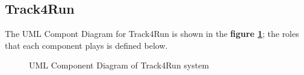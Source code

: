 \subsection{Track4Run}

The UML Compont Diagram for Track4Run is shown in the \textbf{figure \ref{fig:T4R-component}}; the roles that each component plays is defined below.

\begin{figure}[H]
    \centering
    \caption{UML Component Diagram of Track4Run system}
    \label{fig:T4R-component}
\end{figure}


